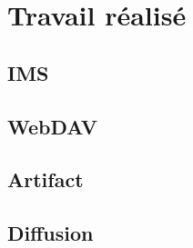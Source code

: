 \chapter{Travail réalisé}
\lipsum
\section{IMS}
\lipsum
\section{WebDAV}
\lipsum
\section{Artifact}
\lipsum
\section{Diffusion}
\lipsum

